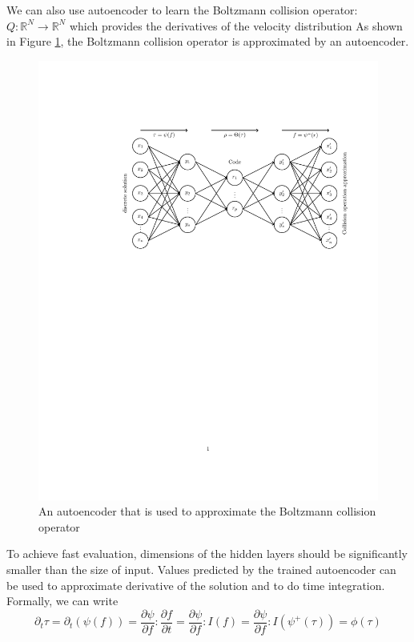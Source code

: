\documentclass{article}
\begin{document}
We can also use autoencoder to learn the Boltzmann collision operator: $Q:\mathbb{R}^N\rightarrow\mathbb{R}^N$ which provides the derivatives of the velocity distribution
As shown in Figure \ref{fig:ColOpAE}, the Boltzmann collision operator is approximated by an autoencoder.
\begin{figure}[h]
	\centering
	\includegraphics[width=.75\textwidth]{ColOpAE.pdf}
	\caption{An autoencoder that is used to approximate the Boltzmann collision operator}
	\label{fig:ColOpAE}
\end{figure}
\noindent To achieve fast evaluation, dimensions of the hidden layers should be significantly smaller than the size of input. Values predicted by the trained autoencoder can be used to approximate derivative of the solution and to do time integration. Formally, we can write
\begin{equation}
	\partial_t{\tau} = \partial_t(\psi(f)) = \frac{\partial\psi}{\partial f}:\frac{\partial f}{\partial t} = \frac{\partial\psi}{\partial f}:I(f) = \frac{\partial\psi}{\partial f}:I(\psi^+(\tau)) = \phi(\tau)
\end{equation}
\end{document}
